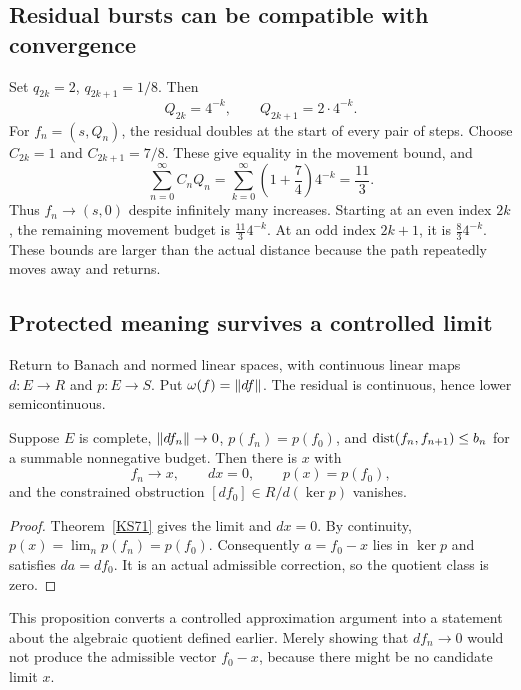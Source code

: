 
\subsection{Residual bursts can be compatible with convergence}
Set \(q_{2k}=2\), \(q_{2k+1}=1/8\). Then
\[
 Q_{2k}=4^{-k},\qquad Q_{2k+1}=2\cdot4^{-k}.
\]
For \(f_n=(s,Q_n)\), the residual doubles at the start of every pair of steps. Choose \(C_{2k}=1\) and \(C_{2k+1}=7/8\). These give equality in the movement bound, and
\[
 \sum_{n=0}^{\infty}C_nQ_n
 =\sum_{k=0}^{\infty}\left(1+\frac74\right)4^{-k}
 =\frac{11}{3}.
\]
Thus \(f_n\to(s,0)\) despite infinitely many increases. Starting at an even index \(2k\), the remaining movement budget is \(\frac{11}{3}4^{-k}\). At an odd index \(2k+1\), it is \(\frac83 4^{-k}\). These bounds are larger than the actual distance because the path repeatedly moves away and returns.


\subsection{Protected meaning survives a controlled limit}
Return to Banach and normed linear spaces, with continuous linear maps \(d:E\to R\) and \(p:E\to S\). Put \(\omega(f)=\left\lVert df\right\rVert\). The residual is continuous, hence lower semicontinuous.

\begin{proposition}\label{KS73}
Suppose \(E\) is complete, \(\left\lVert df_n\right\rVert\to0\), \(p(f_n)=p(f_0)\), and \(\operatorname{dist}(f_n,f_{n+1})\le b_n\) for a summable nonnegative budget. Then there is \(x\) with
\[
 f_n\to x,\qquad dx=0,\qquad p(x)=p(f_0),
\]
and the constrained obstruction \([df_0]\in R/d(\ker p)\) vanishes.
\end{proposition}
\begin{proof}
Theorem~\ref{KS71} gives the limit and \(dx=0\). By continuity, \(p(x)=\lim_n p(f_n)=p(f_0)\). Consequently \(a=f_0-x\) lies in \(\ker p\) and satisfies \(da=df_0\). It is an actual admissible correction, so the quotient class is zero.
\end{proof}
This proposition converts a controlled approximation argument into a statement about the algebraic quotient defined earlier. Merely showing that \(df_n\to0\) would not produce the admissible vector \(f_0-x\), because there might be no candidate limit \(x\).

